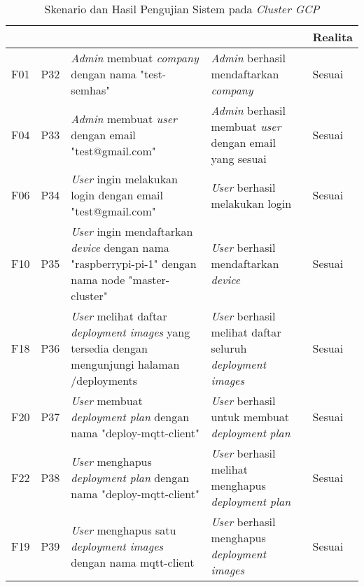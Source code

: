 \bgroup
\begin{table}[ht]
  \def\arraystretch{1.3}
  \caption{Skenario dan Hasil Pengujian Sistem pada \textit{Cluster GCP}}
  \label{tab:pengujian-sistem-gcp}
  \centering
  \begin{tabular}{|p{2cm}|p{2cm}|p{3cm}|p{3cm}|p{1.5cm}|}
    \hline
    \centering{ID Fungsional} & \centering{ID Pengujian} & \centering{Skenario}                                                                                              & \centering{Ekspektasi}                                                   & Realita \\
    \hline
    F01                       & P32                      & \textit{Admin} membuat \textit{company} dengan nama "test-semhas"                                                 & \textit{Admin} berhasil mendaftarkan \textit{company}                    & Sesuai  \\
    \hline
    F04                       & P33                      & \textit{Admin} membuat \textit{user} dengan email  "test@gmail.com"                                               & \textit{Admin} berhasil membuat \textit{user} dengan email yang sesuai   & Sesuai  \\
    \hline
    F06                       & P34                      & \textit{User} ingin melakukan login dengan email  "test@gmail.com"                                                & \textit{User} berhasil melakukan login                                   & Sesuai  \\
    \hline
    F10                       & P35                      & \textit{User} ingin mendaftarkan \textit{device} dengan nama "raspberrypi-pi-1" dengan nama node "master-cluster" & \textit{User} berhasil mendaftarkan \textit{device}                      & Sesuai  \\
    \hline
    F18                       & P36                      & \textit{User} melihat daftar  \textit{deployment images} yang tersedia dengan mengunjungi halaman /deployments    & \textit{User} berhasil melihat daftar seluruh \textit{deployment images} & Sesuai  \\
    \hline
    F20                       & P37                      & \textit{User} membuat \textit{deployment plan} dengan nama "deploy-mqtt-client"                                   & \textit{User} berhasil untuk membuat \textit{deployment} \textit{plan}   & Sesuai  \\
    \hline
    F22                       & P38                      & \textit{User} menghapus \textit{deployment plan} dengan nama "deploy-mqtt-client"                                 & \textit{User} berhasil melihat menghapus \textit{deployment plan}        & Sesuai  \\
    \hline
    F19                       & P39                      & \textit{User} menghapus satu \textit{deployment images} dengan nama mqtt-client                                   & \textit{User} berhasil menghapus \textit{deployment images}              & Sesuai  \\
    \hline
  \end{tabular}
\end{table}
\egroup

